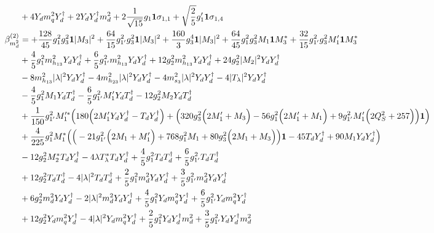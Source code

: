 {\begin{align}
 &+4 {Y_d  m_q^2  Y_{d}^{\dagger}} +2 {Y_d  Y_{d}^{\dagger}  m_d^2} +2 \frac{1}{\sqrt{15}} g_1 {\bf 1} \sigma_{1,1} +\sqrt{\frac{2}{5}} g_1' {\bf 1} \sigma_{1,4} \\ 
\beta_{m_d^2}^{(2)} & =  
+\frac{128}{45} g_{1}^{2} g_{3}^{2} {\bf 1} |M_3|^2 +\frac{64}{15} g_{1'}^{2} g_{3}^{2} {\bf 1} |M_3|^2 +\frac{160}{3} g_{3}^{4} {\bf 1} |M_3|^2 +\frac{64}{45} g_{1}^{2} g_{3}^{2} M_1 {\bf 1} M_3^* +\frac{32}{15} g_{1'}^{2} g_{3}^{2} M_1' {\bf 1} M_3^* \nonumber \\ 
 &+\frac{4}{5} g_{1}^{2} m_{h_{13}}^2 {Y_d  Y_{d}^{\dagger}} +\frac{6}{5} g_{1'}^{2} m_{h_{13}}^2 {Y_d  Y_{d}^{\dagger}} +12 g_{2}^{2} m_{h_{13}}^2 {Y_d  Y_{d}^{\dagger}} +24 g_{2}^{2} |M_2|^2 {Y_d  Y_{d}^{\dagger}} \nonumber \\ 
 &-8 m_{h_{13}}^2 |\lambda|^2 {Y_d  Y_{d}^{\dagger}} -4 m_{h_{23}}^2 |\lambda|^2 {Y_d  Y_{d}^{\dagger}} -4 m_{s_3}^2 |\lambda|^2 {Y_d  Y_{d}^{\dagger}} -4 |T_{\lambda}|^2 {Y_d  Y_{d}^{\dagger}} \nonumber \\ 
 &-\frac{4}{5} g_{1}^{2} M_1 {Y_d  T_{d}^{\dagger}} -\frac{6}{5} g_{1'}^{2} M_1' {Y_d  T_{d}^{\dagger}} -12 g_{2}^{2} M_2 {Y_d  T_{d}^{\dagger}} \nonumber \\ 
 &+\frac{1}{150} g_{1'}^{2} M_1'^* \Big(180 \Big(2 M_1' {Y_d  Y_{d}^{\dagger}}  - {T_d  Y_{d}^{\dagger}} \Big) + \Big(320 g_{3}^{2} \Big(2 M_1'  + M_3\Big) -56 g_{1}^{2} \Big(2 M_1'  + M_1\Big) + 9 g_{1'}^{2} M_1' \Big(2 Q_{S}^{2}  + 257\Big)\Big){\bf 1} \Big)\nonumber \\ 
 &+\frac{4}{225} g_{1}^{2} M_1^* \Big(\Big(-21 g_{1'}^{2} \Big(2 M_1  + M_1'\Big) + 768 g_{1}^{2} M_1  + 80 g_{3}^{2} \Big(2 M_1  + M_3\Big)\Big){\bf 1}  -45 {T_d  Y_{d}^{\dagger}}  + 90 M_1 {Y_d  Y_{d}^{\dagger}} \Big)\nonumber \\ 
 &-12 g_{2}^{2} M_2^* {T_d  Y_{d}^{\dagger}} -4 \lambda T_{\lambda}^* {T_d  Y_{d}^{\dagger}} +\frac{4}{5} g_{1}^{2} {T_d  T_{d}^{\dagger}} +\frac{6}{5} g_{1'}^{2} {T_d  T_{d}^{\dagger}} \nonumber \\ 
 &+12 g_{2}^{2} {T_d  T_{d}^{\dagger}} -4 |\lambda|^2 {T_d  T_{d}^{\dagger}} +\frac{2}{5} g_{1}^{2} {m_d^2  Y_d  Y_{d}^{\dagger}} +\frac{3}{5} g_{1'}^{2} {m_d^2  Y_d  Y_{d}^{\dagger}} \nonumber \\ 
 &+6 g_{2}^{2} {m_d^2  Y_d  Y_{d}^{\dagger}} -2 |\lambda|^2 {m_d^2  Y_d  Y_{d}^{\dagger}} +\frac{4}{5} g_{1}^{2} {Y_d  m_q^2  Y_{d}^{\dagger}} +\frac{6}{5} g_{1'}^{2} {Y_d  m_q^2  Y_{d}^{\dagger}} \nonumber \\ 
 &+12 g_{2}^{2} {Y_d  m_q^2  Y_{d}^{\dagger}} -4 |\lambda|^2 {Y_d  m_q^2  Y_{d}^{\dagger}} +\frac{2}{5} g_{1}^{2} {Y_d  Y_{d}^{\dagger}  m_d^2} +\frac{3}{5} g_{1'}^{2} {Y_d  Y_{d}^{\dagger}  m_d^2} \nonumber \\ 

\end{align}}
